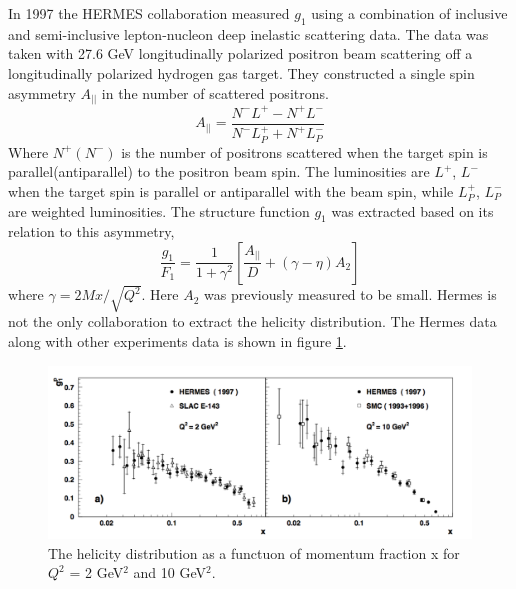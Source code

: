 \documentclass[abstract = on,listof=totoc, bibliography=totoc]{scrreprt}
\begin{document}
In 1997 the HERMES collaboration measured $g_1$ using a combination of inclusive and semi-inclusive lepton-nucleon deep inelastic scattering data. \cite{} The data was taken with 27.6 GeV longitudinally polarized positron beam scattering off a longitudinally polarized hydrogen gas target. They constructed a single spin asymmetry $A_{||}$ in the number of scattered positrons. 
\begin{equation}
A_{||} = \frac{N^-L^+ - N^+L^-}{N^-L_P^+ + N^+L_P^-} 
\end{equation}
Where $N^+(N^-)$ is the number of positrons scattered when the target spin is parallel(antiparallel) to the positron beam spin. The luminosities are $L^+$, $L^-$ when the target spin is parallel or antiparallel with the beam spin, while $L^+_P$, $L^-_P$ are weighted luminosities. The structure function $g_1$ was extracted based on its relation to this asymmetry,
\begin{equation}
\frac{g_1}{F_1} = \frac{1}{1+\gamma^2}\left[\frac{A_{||}}{D} + (\gamma - \eta)A_2\right]
\end{equation}
where $\gamma = 2Mx/\sqrt{Q^2}$. Here $A_2$ was previously measured to be small\cite{hermesHel}\cite{strucFuncsg1g2}.
Hermes is not the only collaboration to extract the helicity distribution. The Hermes data along with other experiments data is shown in figure \ref{fig:helicityDist}. 
 \begin{figure}
\begin{center}
\includegraphics[width = 1\textwidth]{helicityDistFromHermes}
\caption[HERMES results for helicity distribution function]{The helicity distribution as a functuon of momentum fraction x for $Q^2$ = 2 GeV$^2$ and 10 GeV$^2$.}
\label{fig:helicityDist}
\end{center}
\end{figure}
\end{document}
